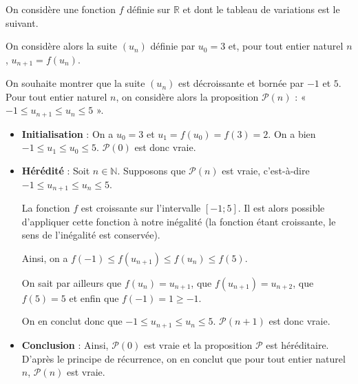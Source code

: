 \documentclass[11pt,fleqn]{book} %
\begin{document}
\begin{example}On considère une fonction $f$ définie sur $\mathbb{R}$ et dont le tableau de variations est le suivant.

\begin{center}
\end{center}

On considère alors la suite $(u_n)$ définie par $u_0=3$ et, pour tout entier naturel $n$, $u_{n+1}=f(u_n)$. 

On souhaite montrer que la suite $(u_n)$ est décroissante et bornée par $-1$ et $5$. Pour tout entier naturel $n$, on considère alors la proposition $\mathcal{P}(n)$ : « $-1 \leqslant u_{n+1} \leqslant u_n \leqslant 5$ ».
\begin{itemize}
\item \textbf{Initialisation} : On a $u_0=3$ et $u_1=f(u_0)=f(3)=2$. On a bien $-1 \leqslant u_1 \leqslant u_0 \leqslant 5$. $\mathcal{P}(0)$ est donc vraie.
\vskip5pt
\item \textbf{Hérédité} : Soit $n\in\mathbb{N}$. Supposons que $\mathcal{P}(n)$ est vraie, c'est-à-dire $-1 \leqslant u_{n+1} \leqslant u_n \leqslant 5$. 

La fonction $f$ est croissante sur l'intervalle $[-1;5]$. Il est alors possible d'appliquer cette fonction à notre inégalité (la fonction étant croissante, le sens de l'inégalité est conservée).

Ainsi, on a $f(-1) \leqslant f(u_{n+1}) \leqslant f(u_n) \leqslant f(5)$. 

On sait par ailleurs que $f(u_n)=u_{n+1}$, que $f(u_{n+1})=u_{n+2}$, que $f(5)=5$ et enfin que $f(-1)=1\geqslant -1$.

On en conclut donc que $-1 \leqslant u_{n+1} \leqslant u_n \leqslant 5$. $\mathcal{P}(n+1)$ est donc vraie.
\vskip5pt
\item \textbf{Conclusion} : Ainsi, $\mathcal{P}(0)$ est vraie et la proposition $\mathcal{P}$ est héréditaire. D'après le principe de récurrence, on en conclut que pour tout entier naturel $n$, $\mathcal{P}(n)$ est vraie.
\end{itemize}\end{example}
\end{document}

